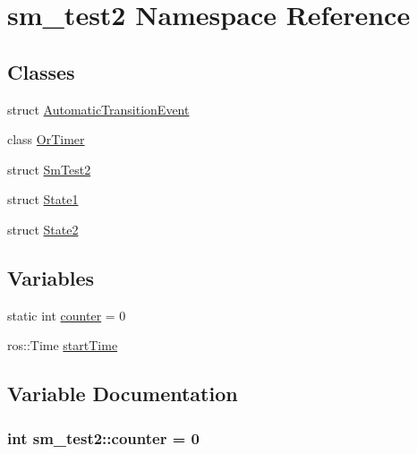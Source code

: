 \hypertarget{namespacesm__test2}{}\section{sm\+\_\+test2 Namespace Reference}
\label{namespacesm__test2}
\subsection*{Classes}
\begin{DoxyCompactItemize}
\item 
struct \hyperlink{structsm__test2_1_1AutomaticTransitionEvent}{Automatic\+Transition\+Event}
\item 
class \hyperlink{classsm__test2_1_1OrTimer}{Or\+Timer}
\item 
struct \hyperlink{structsm__test2_1_1SmTest2}{Sm\+Test2}
\item 
struct \hyperlink{structsm__test2_1_1State1}{State1}
\item 
struct \hyperlink{structsm__test2_1_1State2}{State2}
\end{DoxyCompactItemize}
\subsection*{Variables}
\begin{DoxyCompactItemize}
\item 
static int \hyperlink{namespacesm__test2_a42c85e52b584387fd269df67f8e6c732}{counter} = 0
\item 
ros\+::\+Time \hyperlink{namespacesm__test2_a0b4e1ce52146b421cf6062a0900035aa}{start\+Time}
\end{DoxyCompactItemize}


\subsection{Variable Documentation}
\subsubsection[{\texorpdfstring{counter}{counter}}]{\setlength{\rightskip}{0pt plus 5cm}int sm\+\_\+test2\+::counter = 0\hspace{0.3cm}{\ttfamily [static]}}\hypertarget{namespacesm__test2_a42c85e52b584387fd269df67f8e6c732}{}\label{namespacesm__test2_a42c85e52b584387fd269df67f8e6c732}


